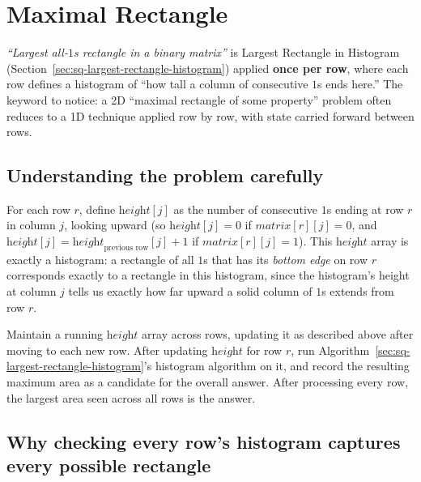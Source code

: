 \section{Maximal Rectangle}
\label{sec:sq-maximal-rectangle}


\begin{patternbox}
\emph{``Largest all-$1$s rectangle in a binary matrix''} is Largest
Rectangle in Histogram (Section~\ref{sec:sq-largest-rectangle-histogram})
applied \textbf{once per row}, where each row defines a histogram of
``how tall a column of consecutive $1$s ends here.'' The keyword to
notice: a 2D ``maximal rectangle of some property'' problem often reduces
to a 1D technique applied row by row, with state carried forward between
rows.
\end{patternbox}

\subsection*{Understanding the problem carefully}

For each row $r$, define $\textit{height}[j]$ as the number of
consecutive $1$s ending at row $r$ in column $j$, looking upward (so
$\textit{height}[j] = 0$ if $\textit{matrix}[r][j] = 0$, and
$\textit{height}[j] = \textit{height}_{\text{previous row}}[j] + 1$ if
$\textit{matrix}[r][j] = 1$). This $\textit{height}$ array is exactly a
histogram: a rectangle of all $1$s that has its \emph{bottom edge} on row
$r$ corresponds exactly to a rectangle in this histogram, since the
histogram's height at column $j$ tells us exactly how far upward a solid
column of $1$s extends from row $r$.

\begin{ideabox}
Maintain a running $\textit{height}$ array across rows, updating it as
described above after moving to each new row. After updating
$\textit{height}$ for row $r$, run
Algorithm~\ref{sec:sq-largest-rectangle-histogram}'s histogram algorithm
on it, and record the resulting maximum area as a candidate for the
overall answer. After processing every row, the largest area seen across
all rows is the answer.
\end{ideabox}

\subsection*{Why checking every row's histogram captures every possible rectangle}


